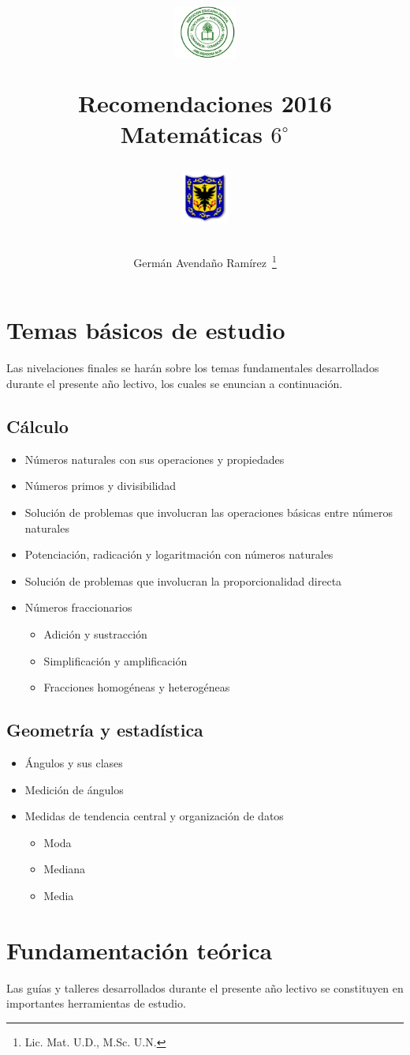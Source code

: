 \documentclass[letterpaper,11pt,twoside]{article}
\author{Germ\'an Avenda\~no Ram\'irez~\thanks{Lic. Mat. U.D., M.Sc. U.N.}}
\title{\begin{minipage}{.2\textwidth}
\includegraphics[height=1.75cm]{Images/logo-colegio.png}\end{minipage}
\begin{minipage}{.55\textwidth}
\begin{center}
Recomendaciones 2016\\
Matemáticas $6^{\circ}$
\end{center}
\end{minipage}\hfill
\begin{minipage}{.2\textwidth}
\includegraphics[height=1.75cm]{Images/logo-sed.png} 
\end{minipage}}
\date{}
\begin{document}
\maketitle
\section*{Temas básicos de estudio}
Las nivelaciones finales se harán sobre los temas fundamentales desarrollados durante el presente año lectivo, los cuales se enuncian a continuación.
\subsection*{Cálculo}
\begin{itemize}
\item Números naturales con sus operaciones y propiedades
\item Números primos y divisibilidad
\item Solución de problemas que involucran las operaciones básicas entre números naturales
\item Potenciación, radicación y logaritmación con números naturales
\item Solución de problemas que involucran la proporcionalidad directa 
\item Números fraccionarios
\begin{itemize}
\item Adición y sustracción
\item Simplificación y amplificación
\item Fracciones homogéneas y heterogéneas
\end{itemize}
\end{itemize}
\subsection*{Geometría y estadística}
\begin{itemize}
\item Ángulos y sus clases
\item Medición de ángulos
\item Medidas de tendencia central y organización de datos
\begin{itemize}
\item Moda
\item Mediana
\item Media
\end{itemize}
\end{itemize}
\section*{Fundamentación teórica}
Las guías y talleres desarrollados durante el presente año lectivo se constituyen en importantes herramientas de estudio.
\end{document}

